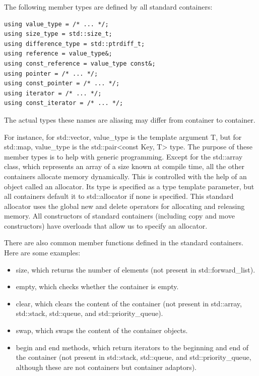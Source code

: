 The following member types are defined by all standard containers:

\begin{lstlisting}[style=styleCXX]
using value_type = /* ... */;
using size_type = std::size_t;
using difference_type = std::ptrdiff_t;
using reference = value_type&;
using const_reference = value_type const&;
using pointer = /* ... */;
using const_pointer = /* ... */;
using iterator = /* ... */;
using const_iterator = /* ... */;
\end{lstlisting}

The actual types these names are aliasing may differ from container to container.

For instance, for std::vector, value\_type is the template argument T, but for std::map, value\_type is the std::pair<const Key, T> type. The purpose of these member types is to help with generic programming. Except for the std::array class, which represents an array of a size known at compile time, all the other containers allocate memory dynamically. This is controlled with the help of an object called an allocator. Its type is specified as a type template parameter, but all containers default it to std::allocator if none is specified. This standard allocator uses the global new and delete operators for allocating and releasing memory. All constructors of standard containers (including copy and move constructors) have overloads that allow us to specify an allocator.

There are also common member functions defined in the standard containers. Here are some examples:

\begin{itemize}
\item
size, which returns the number of elements (not present in std::forward\_list).

\item
empty, which checks whether the container is empty.

\item
clear, which clears the content of the container (not present in std::array, std::stack, std::queue, and std::priority\_queue).

\item
swap, which swaps the content of the container objects.

\item
begin and end methods, which return iterators to the beginning and end of the container (not present in std::stack, std::queue, and std::priority\_queue, although these are not containers but container adaptors).
\end{itemize}

